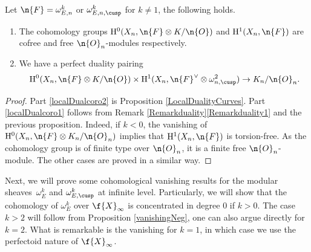 \begin{cor}
\label{localDualcoro}
Let $\n{F}=\omega^k_{E,n}$ or $\omega^k_{E,n,\cusp}$ for $k\neq 1$, the following holds.
\begin{enumerate}
\item\label{localDualcoro1} The cohomology groups $\mathrm{H}^0(X_n, \n{F}\otimes K/\n{O})$ and $\mathrm{H}^1(X_n, \n{F})$ are cofree and free $\n{O}_n$-modules respectively.

\item\label{localDualcoro2} We have a perfect duality pairing
\[
\mathrm{H}^0(X_n, \n{F}\otimes K/\n{O})\times \mathrm{H}^1(X_n, \n{F}^\vee \otimes \omega^2_{n,\cusp})\to K_n/\n{O}_n.
\]
\end{enumerate}
\end{cor}

\begin{proof}
Part \eqref{localDualcoro2} is Proposition \ref{LocalDualityCurves}. Part \eqref{localDualcoro1} follows from Remark \ref{Remarkduality}\eqref{Remarkduality1} and the previous proposition. Indeed, if $k<0$, the vanishing of $\mathrm{H}^0(X_n, \n{F}\otimes K_n/\n{O}_n)$ implies that $\mathrm{H}^1(X_n, \n{F})$ is torsion-free. As the cohomology group is of finite type over $\n{O}_n$, it is a finite free $\n{O}_n$-module. The other cases are proved in a similar way.
\end{proof}

Next, we will prove some cohomological vanishing results for the modular sheaves~$\omega_E^k$ and $\omega^k_{E,\cusp}$ at infinite level. Particularly, we will show that the cohomology of $\omega_E^k$ over $\f{X}_{\infty}$ is concentrated in degree $0$ if $k>0$. The case $k> 2$ will follow from Proposition \ref{vanishingNeg}, one can also argue directly for $k=2$. What is remarkable is the vanishing for $k=1$, in which case we use the perfectoid nature of $\f{X}_{\infty}$.

